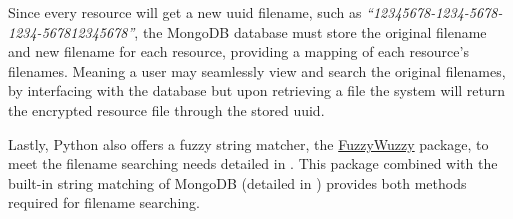 Since every resource will get a new \acrshort{uuid} filename, such as \textit{``12345678-1234-5678-1234-567812345678''}, the MongoDB database must store the original filename and new filename for each resource, providing a mapping of each resource's filenames. Meaning a user may seamlessly view and search the original filenames, by interfacing with the database but upon retrieving a file the system will return the encrypted resource file through the stored \acrshort{uuid}.

Lastly, Python also offers a fuzzy string matcher, the \href{https://pypi.org/project/fuzzywuzzy/}{FuzzyWuzzy} package, to meet the filename searching needs detailed in . This package combined with the built-in string matching of MongoDB (detailed in ) provides both methods required for filename searching.
